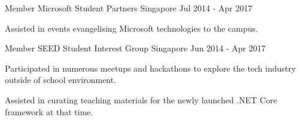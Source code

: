 

\begin{cventries}

  \cventry
    {Member} %
    {Microsoft Student Partners} %
    {Singapore} %
    {Jul 2014 - Apr 2017} %
    {
      \begin{cvitems} %
        \item {Assisted in events evangelising Microsoft technologies to the campus.}
      \end{cvitems}
    }

  \cventry
    {Member} %
    {SEED Student Interest Group} %
    {Singapore} %
    {Jun 2014 - Apr 2017} %
    {
      \begin{cvitems} %
        \item {Participated in numerous meetups and hackathons to explore the tech industry outside of school environment.}
        \item {Assisted in curating teaching materials for the newly launched .NET Core framework at that time.}
      \end{cvitems}
    }

\end{cventries}
